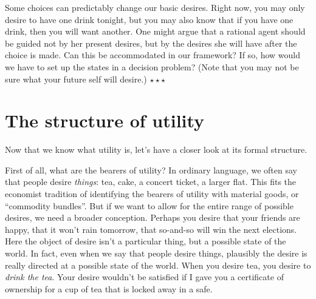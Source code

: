 \begin{exercise}
  Some choices can predictably change our basic desires. Right now,
  you may only desire to have one drink tonight, but you may also know
  that if you have one drink, then you will want another. One might argue
  that a rational agent should be guided not by her present desires,
  but by the desires she will have after the choice is made. Can this
  be accommodated in our framework? If so, how would we have to set up
  the states in a decision problem? (Note that you may not be sure
  what your future self will desire.) $\star\star\star$
  

\end{exercise}


\section{The structure of utility}\label{sec:structure-of-utility}

Now that we know what utility is, let's have a closer look at its
formal structure.

First of all, what are the bearers of utility? In ordinary language,
we often say that people desire \emph{things}: tea, cake, a concert
ticket, a larger flat. This fits the economist tradition of
identifying the bearers of utility with material goods, or ``commodity
bundles''. But if we want to allow for the entire range of possible
desires, we need a broader conception. Perhaps you desire that your
friends are happy, that it won't rain tomorrow, that so-and-so will
win the next elections. Here the object of desire isn't a particular
thing, but a possible state of the world. In fact, even when we say
that people desire things, plausibly the desire is really directed at
a possible state of the world. When you desire tea, you desire to
\emph{drink the tea}. Your desire wouldn't be satisfied if I gave you
a certificate of ownership for a cup of tea that is locked away in a
safe.

